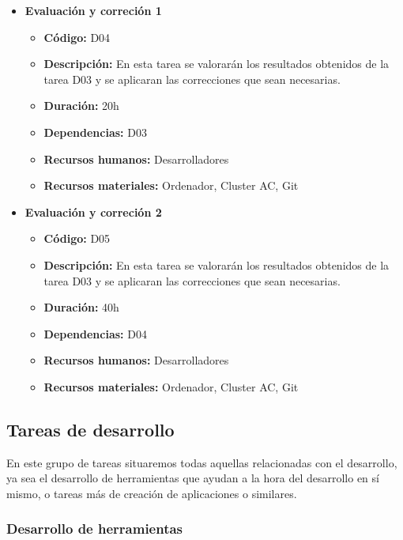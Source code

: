\begin{itemize}
\begin{itemize}
        \end{itemize}
    \item \textbf{Evaluación y correción 1}
        \begin{itemize}
            \item \textbf{Código:} D04
            \item \textbf{Descripción:} En esta tarea se valorarán los resultados obtenidos de la tarea D03 y se aplicaran las correcciones que sean
                necesarias.
            \item \textbf{Duración:} 20h
            \item \textbf{Dependencias:} D03
            \item \textbf{Recursos humanos:} Desarrolladores
            \item \textbf{Recursos materiales:} Ordenador, Cluster AC, Git
        \end{itemize}
    \item \textbf{Evaluación y correción 2}
        \begin{itemize}
            \item \textbf{Código:} D05
            \item \textbf{Descripción:} En esta tarea se valorarán los resultados obtenidos de la tarea D03 y se aplicaran las correcciones que sean
                necesarias.
            \item \textbf{Duración:} 40h
            \item \textbf{Dependencias:} D04
            \item \textbf{Recursos humanos:} Desarrolladores
            \item \textbf{Recursos materiales:} Ordenador, Cluster AC, Git
        \end{itemize}
\end{itemize}

\subsection{Tareas de desarrollo}
\label{subsec:tareas_desarrollo}


En este grupo de tareas situaremos todas aquellas relacionadas con el desarrollo, ya sea el desarrollo de herramientas que ayudan a la hora del desarrollo en
sí mismo, o tareas más de creación de aplicaciones o similares.

\subsubsection{Desarrollo de herramientas}
\label{subsubsec:tareas_herramientas}

